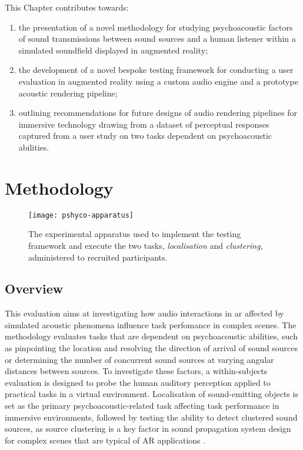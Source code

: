 This Chapter contributes towards:
\begin{enumerate}
    \item the presentation of a novel methodology for studying psychoacoustic factors of sound transmissions between sound sources and a human listener within a simulated soundfield displayed in augmented reality;
    \item the development of a novel bespoke testing framework for conducting a user evaluation in augmented reality using a custom audio engine and a prototype acoustic rendering pipeline;
    \item outlining recommendations for future designs of audio rendering pipelines for immersive technology drawing from a dataset of perceptual responses captured from a user study on two tasks dependent on psychoacoustic abilities.
\end{enumerate}

\section{Methodology}
\begin{figure}[htbp]
    \centering
    \texttt{[image: pshyco-apparatus]}
    \caption[Apparatus overview for psychoacoustic testing]{The experimental apparatus used to implement the testing framework and execute the two tasks, \emph{localisation} and \emph{clustering}, administered to recruited participants.}\label{fig:psycho-apparatus}
\end{figure}

\subsection{Overview}
This evaluation aims at investigating how audio interactions in \acrshort{ar} affected by simulated acoustic phenomena influence task perfomance in complex scenes. The methodology evaluates tasks that are dependent on psychoacoustic abilities, such as pinpointing the location and resolving the direction of arrival of sound sources or determining the number of concurrent sound sources at varying angular distances between sources. To investigate these factors, a within-subjects evaluation is designed to probe the human auditory perception applied to practical tasks in a virtual environment. Localisation of sound-emitting objects is set as the primary psychoacoustic-related task affecting task performance in immersive environments, followed by testing the ability to detect clustered sound sources, as source clustering is a key factor in sound propagation system design for complex scenes that are typical of AR applications \citep{schissler2016interactive}. 


